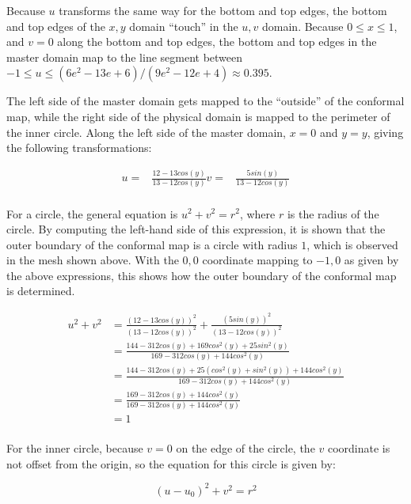 \documentclass[10pt]{article}
\begin{document}
Because \(u\) transforms the same way for the bottom and top edges, the bottom and top edges of the \(x,y\) domain ``touch'' in the \(u,v\) domain. Because \(0\leq x\leq1\), and \(v=0\) along the bottom and top edges, the bottom and top edges in the master domain map to the line segment between \(-1\leq u\leq (6e^2-13e+6)/(9e^2-12e+4)\approx 0.395\). 

The left side of the master domain gets mapped to the ``outside'' of the conformal map, while the right side of the physical domain is mapped to the perimeter of the inner circle. Along the left side of the master domain, \(x=0\) and \(y=y\), giving the following transformations:

\begin{equation}
\begin{aligned}
u=& \frac{12-13cos(y)}{13-12cos(y)}
v=& \frac{5sin(y)}{13-12cos(y)}\\
\end{aligned}
\end{equation}

For a circle, the general equation is \(u^2+v^2=r^2\), where \(r\) is the radius of the circle. By computing the left-hand side of this expression, it is shown that the outer boundary of the conformal map is a circle with radius \(1\), which is observed in the mesh shown above. With the \(0,0\) coordinate mapping to \(-1,0\) as given by the above expressions, this shows how the outer boundary of the conformal map is determined.

\begin{equation}
\begin{aligned}
u^2+v^2& =\frac{(12-13cos(y))^2}{(13-12cos(y))^2}+\frac{(5sin(y))^2}{(13-12cos(y))^2}\\
& =\frac{144-312cos(y)+169cos^2(y)+25sin^2(y)}{169-312cos(y)+144cos^2(y)}\\
& =\frac{144-312cos(y)+25(cos^2(y)+sin^2(y))+144cos^2(y)}{169-312cos(y)+144cos^2(y)}\\
& =\frac{169-312cos(y)+144cos^2(y)}{169-312cos(y)+144cos^2(y)}\\
& = 1\\
\end{aligned}
\end{equation}

For the inner circle, because \(v=0\) on the edge of the circle, the \(v\) coordinate is not offset from the origin, so the equation for this circle is given by:

\begin{equation}
(u-u_0)^2+v^2=r^2
\end{equation}
\end{document}
